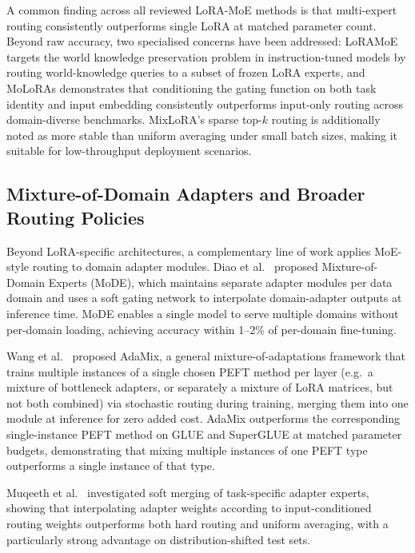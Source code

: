 A common finding across all reviewed LoRA-MoE methods is that multi-expert routing
consistently outperforms single LoRA at matched parameter count. Beyond raw accuracy,
two specialised concerns have been addressed: LoRAMoE \cite{DouLoRAMoE2024} targets the
world knowledge preservation problem in instruction-tuned models by routing
world-knowledge queries to a subset of frozen LoRA experts, and MoLoRAs
\cite{FengMoLoRAs2024} demonstrates that conditioning the gating function on both task
identity and input embedding consistently outperforms input-only routing across
domain-diverse benchmarks. MixLoRA's sparse top-$k$ routing is additionally noted as
more stable than uniform averaging under small batch sizes, making it suitable for
low-throughput deployment scenarios.

\subsection{Mixture-of-Domain Adapters and Broader Routing Policies}
\label{sec:moe_routing:domain}

Beyond LoRA-specific architectures, a complementary line of work applies MoE-style
routing to domain adapter modules. Diao et al.~\cite{DiaomMoDE2023} proposed Mixture-of-Domain
Experts (MoDE), which maintains separate adapter modules per data domain and uses a
soft gating network to interpolate domain-adapter outputs at inference time. MoDE
enables a single model to serve multiple domains without per-domain loading, achieving
accuracy within 1--2\% of per-domain fine-tuning.

Wang et al.~\cite{WangAdaMix2022} proposed AdaMix, a general mixture-of-adaptations framework
that trains multiple instances of a single chosen PEFT method per layer (e.g.\ a mixture
of bottleneck adapters, or separately a mixture of LoRA matrices, but not both combined)
via stochastic routing during training, merging them into one module at inference for
zero added cost. AdaMix outperforms the corresponding single-instance PEFT method on
GLUE and SuperGLUE at matched parameter budgets, demonstrating that mixing multiple
instances of one PEFT type outperforms a single instance of that type.

Muqeeth et al.~\cite{Muqeeth2024} investigated soft merging of task-specific adapter experts, showing
that interpolating adapter weights according to input-conditioned routing weights
outperforms both hard routing and uniform averaging, with a particularly strong
advantage on distribution-shifted test sets.

